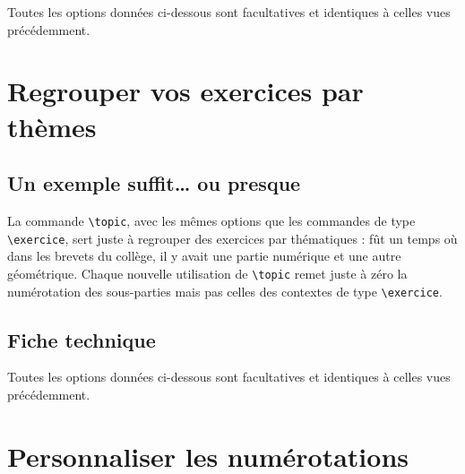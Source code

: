 \documentclass[12pt,a4paper]{scrartcl}
\makeatletter
\theoremstyle{definition}
\newcommand\resetallcnt{
    	\setcounter{lyxam@counter@topic}{0}
    	\setcounter{lyxam@counter@exercise}{0}
    	\setcounter{lyxam@counter@problem}{0}
    	\setcounter{lyxam@counter@bonus}{0}
    	\setcounter{lyxam@counter@subpart}{0}
    }
\newcommand\IDmacro{\@ifstar{\@IDmacroStar}{\@IDmacroNoStar}}
\newcommand\@IDmacroNoStar[3]{%
    \texttt{%
    	\textbackslash#1%
    	\IfStrEq{#2}{0}{}{%
    		\,\,[#2 Option%
			\IfStrEq{#2}{1}{}{s}]%
		}%
	    \IfStrEq{#3}{}{}{%
    		\,\,(#3 Argument%
			\IfStrEq{#3}{1}{}{s})%
		}
   	}
    \immediate\write\tempfile{macro@#1@#2@#3}%
}
\newcommand\@IDmacroStar[2]{%
    \@IDmacroNoStar{#1}{0}{#2}%
}
\makeatother
\begin{document}
Toutes les options données ci-dessous sont facultatives et identiques à celles vues précédemment.

\bigskip


\IDmacro{subpart}{6}{}

\exosoptions{}



\section{Regrouper vos exercices par thèmes}

    \subsection{Un exemple suffit\dots{} ou presque}

La commande \verb+\topic+, avec les mêmes options que les commandes de type \verb+\exercice+, sert juste à regrouper des exercices par thématiques : fût un temps où dans les brevets du collège, il y avait une partie numérique et une autre géométrique.
Chaque nouvelle utilisation de \verb+\topic+ remet juste à zéro la numérotation des sous-parties mais pas celles des contextes de type \verb+\exercice+.

\resetallcnt{}

\begin{tcblisting}{}
\topic
\exercise
\exercise

\topic
\exercise
\end{tcblisting}


    \subsection{Fiche technique}

Toutes les options données ci-dessous sont facultatives et identiques à celles vues précédemment.

\bigskip


\IDmacro{topic}{6}{}

\exosoptions{}



\section{Personnaliser les numérotations}
\end{document}
